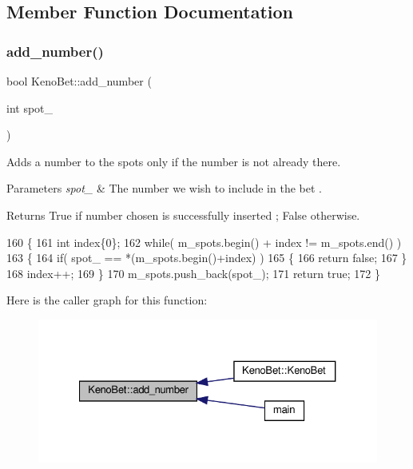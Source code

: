 \subsection{Member Function Documentation}
\mbox{\label{classKenoBet_aba848a50d30a0155459eb9f5cbb91966}} 
\subsubsection{\texorpdfstring{add\+\_\+number()}{add\_number()}}
{\footnotesize\ttfamily bool Keno\+Bet\+::add\+\_\+number (\begin{DoxyParamCaption}\item[{int}]{spot\+\_\+ }\end{DoxyParamCaption})}



Adds a number to the spots only if the number is not already there. 


\begin{DoxyParams}{Parameters}
{\em spot\+\_\+} & The number we wish to include in the bet . \\
\hline
\end{DoxyParams}
\begin{DoxyReturn}{Returns}
True if number chosen is successfully inserted ; False otherwise. 
\end{DoxyReturn}

\begin{DoxyCode}
160 \{
161     \textcolor{keywordtype}{int} index\{0\};
162     \textcolor{keywordflow}{while}( m\_spots.begin() + index != m\_spots.end() )
163     \{
164         \textcolor{keywordflow}{if}( spot\_ == *(m\_spots.begin()+index) )
165         \{
166             \textcolor{keywordflow}{return} \textcolor{keyword}{false};
167         \}
168         index++;
169     \}
170     m\_spots.push\_back(spot\_);
171     \textcolor{keywordflow}{return} \textcolor{keyword}{true};
172 \}
\end{DoxyCode}
Here is the caller graph for this function\+:
\nopagebreak
\begin{figure}[H]
\begin{center}
\leavevmode
\includegraphics[width=327pt]{classKenoBet_aba848a50d30a0155459eb9f5cbb91966_icgraph}
\end{center}
\end{figure}
\mbox{\label{classKenoBet_a612b57c35203a41682269cdfbb31c2b1}} 
